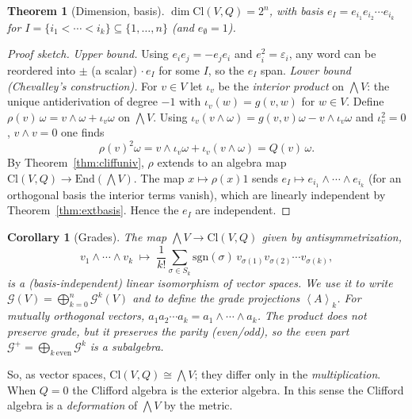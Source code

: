 \documentclass[11pt,a4paper]{article}
\newcounter{thm}[section]
\numberwithin{equation}{section}
\theoremstyle{definition}
\theoremstyle{plain}
\newtheorem{theorem}[thm]{Theorem}
\newtheorem{corollary}[thm]{Corollary}
\newcommand{\sgn}{\mathrm{sgn}}
\newcommand{\Cl}{\mathrm{Cl}}
\newcommand{\GA}{\mathcal{G}}
\newcommand{\gr}[2]{\left\langle #1 \right\rangle_{#2}}
\begin{document}
\begin{theorem}[Dimension, basis]\label{thm:cliffbasis}
$\dim\Cl(V,Q)=2^n$, with basis $e_I=e_{i_1}e_{i_2}\cdots e_{i_k}$ for $I=\{i_1<\cdots<i_k\}\subseteq\{1,\dots,n\}$ (and $e_\emptyset=1$).
\end{theorem}
\begin{proof}[Proof sketch]
\emph{Upper bound.} Using $e_ie_j=-e_je_i$ and $e_i^2=\varepsilon_i$, any word can be reordered into $\pm$ (a scalar) $\cdot\,e_I$ for some $I$, so the $e_I$ span.
\emph{Lower bound (Chevalley's construction).} For $v\in V$ let $\iota_v$ be the \emph{interior product} on $\bigwedge V$: the unique antiderivation of degree $-1$ with $\iota_v(w)=g(v,w)$ for $w\in V$. Define
$\rho(v)\,\omega=v\wedge\omega+\iota_v\omega$ on $\bigwedge V$. Using $\iota_v(v\wedge\omega)=g(v,v)\omega-v\wedge\iota_v\omega$ and $\iota_v^2=0$, $v\wedge v=0$ one finds
\[
 \rho(v)^2\omega=v\wedge\iota_v\omega+\iota_v(v\wedge\omega)=Q(v)\,\omega .
\]
By Theorem~\ref{thm:cliffuniv}, $\rho$ extends to an algebra map $\Cl(V,Q)\to\mathrm{End}(\bigwedge V)$. The map $x\mapsto\rho(x)1$ sends $e_I\mapsto e_{i_1}\wedge\cdots\wedge e_{i_k}$ (for an orthogonal basis the interior terms vanish), which are linearly independent by Theorem~\ref{thm:extbasis}. Hence the $e_I$ are independent.
\end{proof}

\begin{corollary}[Grades]\label{cor:grades}
The map $\bigwedge V\to\Cl(V,Q)$ given by antisymmetrization,
\[
 v_1\wedge\cdots\wedge v_k\;\longmapsto\;\frac1{k!}\sum_{\sigma\in S_k}\sgn(\sigma)\,v_{\sigma(1)}v_{\sigma(2)}\cdots v_{\sigma(k)},
\]
is a (basis-independent) linear isomorphism of vector spaces. We use it to write $\GA(V)=\bigoplus_{k=0}^n\GA^k(V)$ and to define the
\emph{grade projections} $\gr{A}{k}$. For \emph{mutually orthogonal} vectors, $a_1a_2\cdots a_k=a_1\wedge\cdots\wedge a_k$. The product does \emph{not} preserve grade, but it preserves the parity (even/odd), so the \emph{even part} $\GA^+=\bigoplus_{k\ \mathrm{even}}\GA^k$ is a subalgebra.
\end{corollary}

\begin{remark}
So, as vector spaces, $\Cl(V,Q)\cong\bigwedge V$; they differ only in the \emph{multiplication}. When $Q=0$ the Clifford algebra is the exterior algebra. In this sense the Clifford algebra is a \emph{deformation} of $\bigwedge V$ by the metric.
\end{remark}
\end{document}
